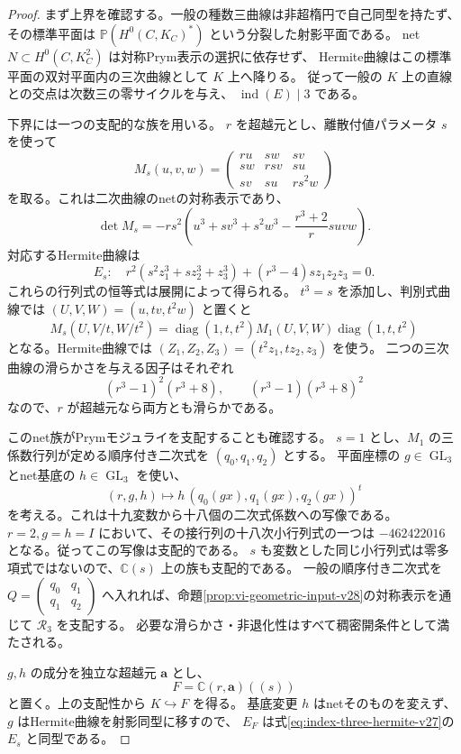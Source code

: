 \begin{proof}
まず上界を確認する。一般の種数三曲線は非超楕円で自己同型を持たず、
その標準平面は $\mathbb P(H^0(C,K_C)^*)$ という分裂した射影平面である。
net $N\subset H^0(C,K_C^2)$ は対称Prym表示の選択に依存せず、
Hermite曲線はこの標準平面の双対平面内の三次曲線として $K$ 上へ降りる。
従って一般の $K$ 上の直線との交点は次数三の零サイクルを与え、
$\operatorname{ind}(E)\mid3$ である。

下界には一つの支配的な族を用いる。
$r$ を超越元とし、離散付値パラメータ $s$ を使って
\[
 M_s(u,v,w)=
 \begin{pmatrix}
 ru&sw&sv\\
 sw&rsv&su\\
 sv&su&rs^2w
 \end{pmatrix}
\]
を取る。これは二次曲線のnetの対称表示であり、
\[
 \det M_s=-rs^2\left(
 u^3+sv^3+s^2w^3-\frac{r^3+2}{r}suvw\right).
\]
対応するHermite曲線は
\begin{equation}\label{eq:index-three-hermite-v27}
 E_s:\quad
 r^2(s^2z_1^3+sz_2^3+z_3^3)+(r^3-4)sz_1z_2z_3=0.
\end{equation}
これらの行列式の恒等式は展開によって得られる。
$t^3=s$ を添加し、判別式曲線では
$(U,V,W)=(u,tv,t^2w)$ と置くと
\[
 M_s(U,V/t,W/t^2)
 =\operatorname{diag}(1,t,t^2)
   M_1(U,V,W)
   \operatorname{diag}(1,t,t^2)
\]
となる。Hermite曲線では $(Z_1,Z_2,Z_3)=(t^2z_1,tz_2,z_3)$ を使う。
二つの三次曲線の滑らかさを与える因子はそれぞれ
\[
 (r^3-1)^2(r^3+8),\qquad (r^3-1)(r^3+8)^2
\]
なので、$r$ が超越元なら両方とも滑らかである。

このnet族がPrymモジュライを支配することも確認する。
$s=1$ とし、$M_1$ の三係数行列が定める順序付き二次式を $(q_0,q_1,q_2)$ とする。
平面座標の $g\in\operatorname{GL}_3$ とnet基底の $h\in\operatorname{GL}_3$ を使い、
\[
 (r,g,h)\longmapsto h\,(q_0(gx),q_1(gx),q_2(gx))^t
\]
を考える。これは十九変数から十八個の二次式係数への写像である。
$r=2,g=h=I$ において、その接行列の十八次小行列式の一つは
$-462422016$ となる。従ってこの写像は支配的である。
$s$ も変数とした同じ小行列式は零多項式ではないので、$\mathbb C(s)$ 上の族も支配的である。
一般の順序付き二次式を $Q=\left(\begin{smallmatrix}q_0&q_1\\q_1&q_2\end{smallmatrix}\right)$
へ入れれば、命題\ref{prop:vi-geometric-input-v28}の対称表示を通じて $\mathcal R_3$ を支配する。
必要な滑らかさ・非退化性はすべて稠密開条件として満たされる。

$g,h$ の成分を独立な超越元 $\mathbf a$ とし、
\[
 F=\mathbb C(r,\mathbf a)((s))
\]
と置く。上の支配性から $K\hookrightarrow F$ を得る。
基底変更 $h$ はnetそのものを変えず、$g$ はHermite曲線を射影同型に移すので、
$E_F$ は式\eqref{eq:index-three-hermite-v27}の $E_s$ と同型である。


\end{proof}
